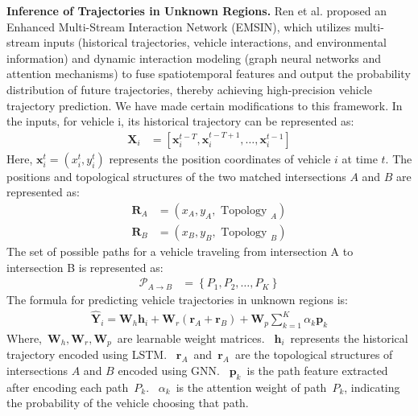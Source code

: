 \textbf{Inference of Trajectories in Unknown Regions.}
Ren et al. proposed an Enhanced Multi-Stream Interaction Network (EMSIN), which utilizes multi-stream inputs (historical trajectories, vehicle interactions, and environmental information) and dynamic interaction modeling (graph neural networks and attention mechanisms) to fuse spatiotemporal features and output the probability distribution of future trajectories, thereby achieving high-precision vehicle trajectory prediction\cite{Alpher24d}. 
We have made certain modifications to this framework. 
In the inputs, for vehicle i, its historical trajectory can be represented as:
\begin{align}
	\mathbf{X}_{i} & = \left[\mathbf{x}_{i}^{t-T}, \mathbf{x}_{i}^{t-T+1}, \ldots, \mathbf{x}_{i}^{t-1}\right]
\end{align}
Here, $\mathbf{x}_{i}^{t}=\left(x_{i}^{t}, y_{i}^{t}\right)$ represents the position coordinates of vehicle $i$ at time $t$.
The positions and topological structures of the two matched intersections $A$ and $B$ are represented as:
\begin{align}
	\mathbf{R}_{A} & = \left(x_{A}, y_{A}, \text { Topology }_{A}\right) \\
	\mathbf{R}_{B} & = \left(x_{B}, y_{B}, \text { Topology }_{B}\right)
\end{align}
The set of possible paths for a vehicle traveling from intersection A to intersection B is represented as:
\begin{align}
	\mathcal{P}_{A \rightarrow B} & = \left\{P_{1}, P_{2}, \ldots, P_{K}\right\}
\end{align}
The formula for predicting vehicle trajectories in unknown regions is:
\begin{align}
\hat{\mathbf{Y}}_{i} = \mathbf{W}_{h} \mathbf{h}_{i}+\mathbf{W}_{r}\left(\mathbf{r}_{A}+\mathbf{r}_{B}\right)+\mathbf{W}_{p} \sum_{k = 1}^{K} \alpha_{k} \mathbf{p}_{k}
\end{align}
Where, $\mathbf{W}_{h}, \mathbf{W}_{r}, \mathbf{W}_{p}$ are learnable weight matrices. 
$\mathbf{h}_{i}$ represents the historical trajectory encoded using LSTM. 
$\mathbf{r}_{A}$ and $\mathbf{r}_{A}$ are the topological structures of intersections $A$ and $B$ encoded using GNN. 
$\mathbf{p}_{k}$ is the path feature extracted after encoding each path $P_{k}$. 
$\alpha_{k}$ is the attention weight of path $P_{k}$, indicating the probability of the vehicle choosing that path.


